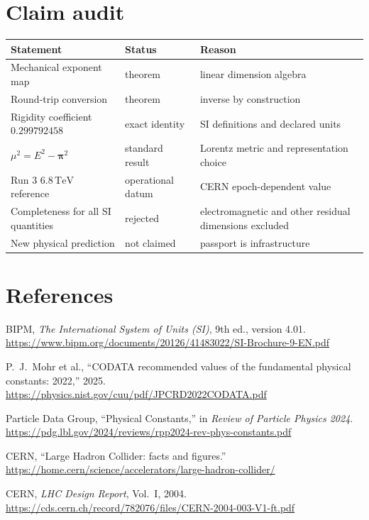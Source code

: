 \documentclass[11pt,a4paper]{article}
\theoremstyle{definition}
\theoremstyle{plain}
\theoremstyle{remark}
\begin{document}
\section{Claim audit}

\begin{center}
\begin{tabularx}{\linewidth}{@{}L{47mm}L{28mm}Y@{}}
\toprule
Statement & Status & Reason \\
\midrule
Mechanical exponent map & theorem & linear dimension algebra \\
Round-trip conversion & theorem & inverse by construction \\
Rigidity coefficient \(0.299792458\) & exact identity & SI definitions and declared units \\
\(\mu^2=E^2-\bm\pi^2\) & standard result & Lorentz metric and representation choice \\
Run 3 \(6.8\,\mathrm{TeV}\) reference & operational datum & CERN epoch-dependent value \\
Completeness for all SI quantities & rejected & electromagnetic and other residual dimensions excluded \\
New physical prediction & not claimed & passport is infrastructure \\
\bottomrule
\end{tabularx}
\end{center}

\section*{References}

\begin{enumerate}[label={[\arabic*]}]
  \item BIPM, \emph{The International System of Units (SI)},
  9th ed., version 4.01.
  \url{https://www.bipm.org/documents/20126/41483022/SI-Brochure-9-EN.pdf}
  \item P.\ J.\ Mohr et al., ``CODATA recommended values of the
  fundamental physical constants: 2022,'' 2025.
  \url{https://physics.nist.gov/cuu/pdf/JPCRD2022CODATA.pdf}
  \item Particle Data Group, ``Physical Constants,'' in
  \emph{Review of Particle Physics 2024}.
  \url{https://pdg.lbl.gov/2024/reviews/rpp2024-rev-phys-constants.pdf}
  \item CERN, ``Large Hadron Collider: facts and figures.''
  \url{https://home.cern/science/accelerators/large-hadron-collider/}
  \item CERN, \emph{LHC Design Report}, Vol.\ I, 2004.
  \url{https://cds.cern.ch/record/782076/files/CERN-2004-003-V1-ft.pdf}
\end{enumerate}
\end{document}

